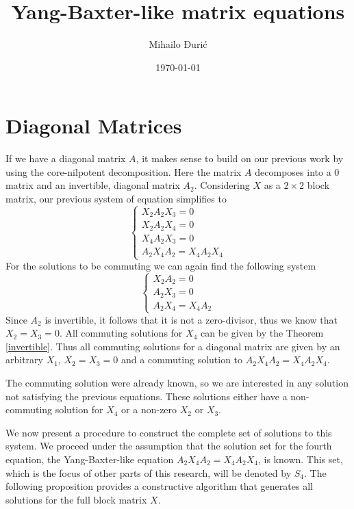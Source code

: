 \documentclass{article}
\title{Yang-Baxter-like matrix equations}
\author{Mihailo Đurić}
\date{\today}
\begin{document}
\maketitle
\tableofcontents
\newpage

\section{Diagonal Matrices}
If we have a diagonal matrix $A$, it makes sense to build on our previous work by using the core-nilpotent decomposition.
Here the matrix $A$ decomposes into a $0$ matrix and an invertible, diagonal matrix $A_2$.
Considering $X$ as a $2 \times 2$ block matrix, our previous system of equation simplifies to
\[\begin{cases}
  X_2 A_2 X_3 = 0\\
  X_2 A_2 X_4 = 0\\
  X_4 A_2 X_3 = 0\\
  A_2 X_4 A_2 = X_4 A_2 X_4
\end{cases}\]
For the solutions to be commuting we can again find the following system
\[\begin{cases}
  X_2 A_2 = 0\\
  A_2 X_3 = 0\\
  A_2 X_4 = X_4 A_2
\end{cases}\]
Since $A_2$ is invertible, it follows that it is not a zero-divisor, thus we know that $X_2 = X_3 = 0$.
All commuting solutions for $X_4$ can be given by the Theorem \ref{invertible}.
Thus all commuting solutions for a diagonal matrix are given by an arbitrary $X_1$, $X_2 = X_3 = 0$ and a commuting solution to $A_2 X_4 A_2 = X_4 A_2 X_4$.

The commuting solution were already known, so we are interested in any solution not satisfying the previous equations.
These solutions either have a non-commuting solution for $X_4$ or a non-zero $X_2$ or $X_3$.

We now present a procedure to construct the complete set of solutions to this system.
We proceed under the assumption that the solution set for the fourth equation, the Yang-Baxter-like equation $A_2 X_4 A_2 = X_4 A_2 X_4$, is known.
This set, which is the focus of other parts of this research, will be denoted by $S_4$.
The following proposition provides a constructive algorithm that generates all solutions for the full block matrix $X$.
\end{document}
